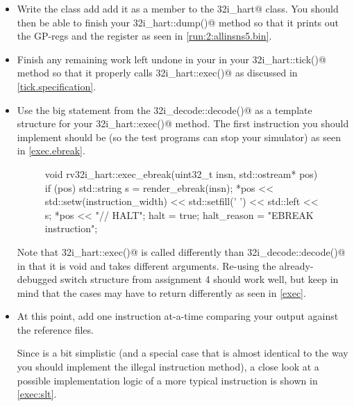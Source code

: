 \documentclass{article}
\begin{document}
\begin{itemize}
\item
Write the \verb@registerfile@ class add add it as a member to the \verb@rv32i_hart@ class.  
You should then be able to finish your \verb@rv32i_hart::dump()@ method so that it prints out the 
GP-regs and the \verb@pc@ register as seen in \autoref{run:2:allinsns5.bin}.

\item
Finish any remaining work left undone in your in your \verb@rv32i_hart::tick()@ method so that
it properly calls \verb@rv32i_hart::exec()@ as discussed in \autoref{tick.specification}.

\item
Use the big \verb@switch@ statement from the \verb@rv32i_decode::decode()@ as a template 
structure for your \verb@rv32i_hart::exec()@ method. The first instruction you should implement
should be \verb@ebreak@ (so the test programs can stop your simulator) as seen in 
\autoref{exec.ebreak}.

\begin{figure}[ht]
\begin{minipage}{\textwidth}
\centering
\begin{tty}
void rv32i_hart::exec_ebreak(uint32_t insn, std::ostream* pos)
{
    if (pos)
    {
        std::string s = render_ebreak(insn);
        *pos << std::setw(instruction_width) << std::setfill(' ') << std::left << s;
        *pos << "// HALT";
    }
    halt = true;
    halt_reason = "EBREAK instruction";
}
\end{tty}
\end{minipage}
\label{exec.ebreak}
\end{figure}

Note that \verb@rv32i_hart::exec()@ is called differently than \verb@rv32i_decode::decode()@ 
in that it is
void and takes different arguments.  Re-using the already-debugged switch structure
from assignment 4 should work well, but keep in mind that the cases may
have to return differently as seen in \autoref{exec}.





\item
At this point, add one instruction at-a-time comparing your output against the reference files.

Since \verb@ebreak@ is a bit simplistic (and a special case that is almost identical to the way
you should implement the illegal instruction method), a close look at a possible implementation
logic of a more typical instruction is shown in \autoref{exec:slt}.


\end{itemize}
\end{document}
